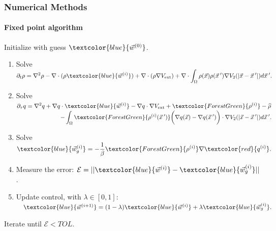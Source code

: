 \documentclass[aspectratio=169,xcolor=dvipsnames]{beamer}
\begin{document}
\begin{frame}
	\frametitle{Numerical Methods}
\framesubtitle{Fixed point algorithm}
\vspace{0.2 cm}
Initialize with guess $\textcolor{blue}{\vec{w}^{(0)}}$.
	\begin{enumerate}
     \item 
     Solve 
     	$ \displaystyle\partial_t \rho  = \nabla^2 \rho  - \nabla \cdot (\rho \textcolor{blue}{\vec{w}^{(i)}} ) + \nabla \cdot \left( \rho \nabla V_{\text{ext}} \right)
     	+ \nabla \cdot \int_\Omega \rho(\vec{x}) \rho(\vec{x}\hspace{0.2em}') \nabla V_2(|\vec{x}-\vec{x}\hspace{0.2em}'|)d\vec{x}\hspace{0.2em}'.$
	 \item
     Solve 
     	$\partial_{{\tau}} q  = \displaystyle \nabla^2 q  + \nabla q  \cdot \textcolor{blue}{\vec{w}^{(i)}} - \nabla q \cdot \nabla V_{\text{ext}} + \textcolor{ForestGreen}{\rho^{(i)}}  - \widehat \rho$\\
     	$\displaystyle \qquad \qquad \qquad \quad \ - \int_\Omega \textcolor{ForestGreen}{\rho^{(i)}(\vec{x}\hspace{0.2em}')} \bigg(\nabla q( \vec{x} ) - \nabla q( \vec{x}\hspace{0.2em}')\bigg) \cdot \nabla V_2(|\vec{x}-\vec{x}\hspace{0.2em}'|)d\vec{x}\hspace{0.2em}'. $
     \item Solve $\displaystyle \textcolor{blue}{\vec{w}^{(i)}_g} = - \frac{1}{\beta}\textcolor{ForestGreen}{{\rho}^{(i)}} \nabla \textcolor{red}{{q}^{(i)}}.$\\
     \item Measure the error: $ \mathcal{E} = ||\textcolor{blue}{\vec{w}^{(i)}} - \textcolor{blue}{\vec{w}^{(i)}_g}||$.
     \vspace{0.2 cm}
	 \item Update control, with $\lambda \in [0,1]$:       $\quad \textcolor{blue}{\vec{w}^{(i+1)}} = (1-\lambda)\textcolor{blue}{\vec{w}^{(i)}} + \lambda \textcolor{blue}{\vec{w}^{(i)}_g}.$	 
	\end{enumerate}	
\vspace{0.2 cm}
Iterate until $\mathcal{E} <TOL$.
\end{frame}
\end{document}
